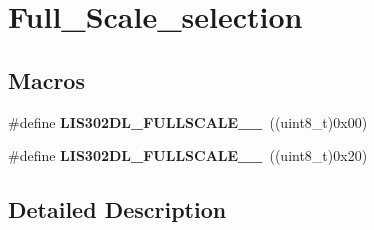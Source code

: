 \hypertarget{group___full___scale__selection}{\section{Full\-\_\-\-Scale\-\_\-selection}
\label{group___full___scale__selection}
}
\subsection*{Macros}
\begin{DoxyCompactItemize}
\item 
\hypertarget{group___full___scale__selection_ga61de19f1b259f0fccd518c107d7a77f8}{\#define {\bfseries L\-I\-S302\-D\-L\-\_\-\-F\-U\-L\-L\-S\-C\-A\-L\-E\-\_\-\_}~((uint8\-\_\-t)0x00)}\label{group___full___scale__selection_ga61de19f1b259f0fccd518c107d7a77f8}

\item 
\hypertarget{group___full___scale__selection_ga16ca1855245a46f98f25fcb45281ddba}{\#define {\bfseries L\-I\-S302\-D\-L\-\_\-\-F\-U\-L\-L\-S\-C\-A\-L\-E\-\_\-\_}~((uint8\-\_\-t)0x20)}\label{group___full___scale__selection_ga16ca1855245a46f98f25fcb45281ddba}

\end{DoxyCompactItemize}


\subsection{Detailed Description}
